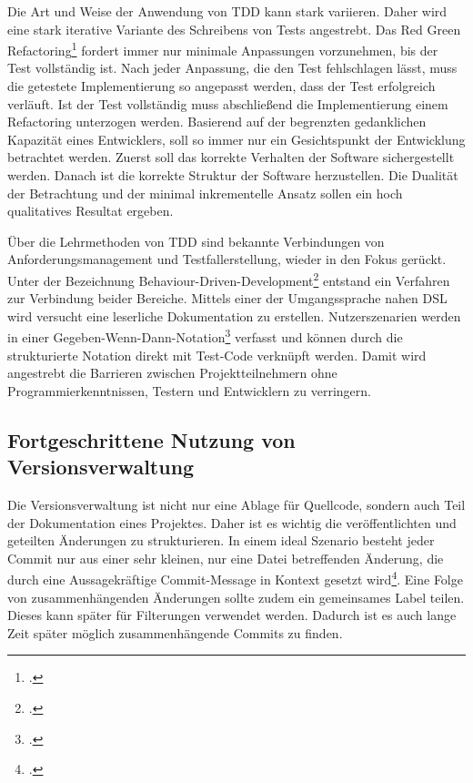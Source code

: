 Die Art und Weise der Anwendung von TDD kann stark variieren. Daher wird eine stark iterative Variante des Schreibens von Tests angestrebt. Das \glqq Red Green Refactoring\grqq{}\footcite[vgl.][Kap.
Red-Green-Refactor
]{tdd-java} fordert immer nur minimale Anpassungen vorzunehmen, bis der Test vollständig ist. Nach jeder Anpassung, die den Test fehlschlagen lässt, muss die getestete Implementierung so angepasst werden, dass der Test erfolgreich verläuft. Ist der Test vollständig muss abschließend die Implementierung einem Refactoring unterzogen werden. Basierend auf der begrenzten gedanklichen Kapazität eines Entwicklers, soll so immer nur ein Gesichtspunkt der Entwicklung betrachtet werden. Zuerst soll das korrekte Verhalten der Software sichergestellt werden. Danach ist die korrekte Struktur der Software herzustellen. Die Dualität der Betrachtung und der minimal inkrementelle Ansatz sollen ein hoch qualitatives Resultat ergeben.

Über die Lehrmethoden von TDD sind bekannte Verbindungen von Anforderungsmanagement und Testfallerstellung, wieder in den Fokus gerückt. Unter der Bezeichnung \glqq Behaviour-Driven-Development\grqq{}\footcite{bdd-north} entstand ein Verfahren zur Verbindung beider Bereiche. Mittels einer der Umgangssprache nahen DSL wird versucht eine leserliche Dokumentation zu erstellen. Nutzerszenarien werden in einer Gegeben-Wenn-Dann-Notation\footcite{fowler-gwt} verfasst und können durch die strukturierte Notation direkt mit Test-Code verknüpft werden. Damit wird angestrebt die Barrieren zwischen Projektteilnehmern ohne Programmierkenntnissen, Testern und Entwicklern zu verringern.

\subsection{Fortgeschrittene Nutzung von Versionsverwaltung}

Die Versionsverwaltung ist nicht nur eine Ablage für Quellcode, sondern auch Teil der Dokumentation eines Projektes. Daher ist es wichtig die veröffentlichten und geteilten Änderungen zu strukturieren. In einem ideal Szenario besteht jeder Commit nur aus einer sehr kleinen, nur eine Datei betreffenden Änderung, die durch eine Aussagekräftige Commit-Message in Kontext gesetzt wird\footcite[vgl.][Kap. Making only one change per commit]{git-essentials-2017}. Eine Folge von zusammenhängenden Änderungen sollte zudem ein gemeinsames Label teilen. Dieses kann später für Filterungen verwendet werden. Dadurch ist es auch lange Zeit später möglich zusammenhängende Commits zu finden.

